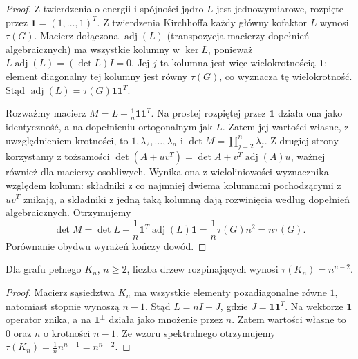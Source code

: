 \begin{proof}
Z twierdzenia o energii i spójności jądro $L$ jest
jednowymiarowe, rozpięte przez $\mathbf1=(1,\ldots,1)^T$.
Z twierdzenia Kirchhoffa każdy główny kofaktor $L$
wynosi $\tau(G)$. Macierz dołączona
$\operatorname{adj}(L)$ (transpozycja macierzy dopełnień
algebraicznych) ma wszystkie kolumny w $\ker L$,
ponieważ $L\operatorname{adj}(L)=(\det L)I=0$.
Jej $j$-ta kolumna jest więc wielokrotnością
$\mathbf1$; element diagonalny tej kolumny jest
równy $\tau(G)$, co wyznacza tę wielokrotność.
Stąd $\operatorname{adj}(L)=\tau(G)\mathbf1\mathbf1^T$.

Rozważmy macierz
$M=L+\tfrac1n\mathbf1\mathbf1^T$.
Na prostej rozpiętej przez $\mathbf1$ działa ona jako
identyczność, a na dopełnieniu ortogonalnym jak $L$.
Zatem jej wartości własne, z uwzględnieniem krotności,
to $1,\lambda_2,\ldots,\lambda_n$
i $\det M=\prod_{j=2}^n\lambda_j$.
Z drugiej strony korzystamy z tożsamości
$\det(A+uv^T)=\det A+v^T\operatorname{adj}(A)u$,
ważnej również dla macierzy osobliwych.
Wynika ona z wieloliniowości wyznacznika względem
kolumn: składniki z co najmniej dwiema kolumnami
pochodzącymi z $uv^T$ znikają, a składniki z jedną
taką kolumną dają rozwinięcia według dopełnień
algebraicznych. Otrzymujemy
\[
\det M=\det L+\frac1n\mathbf1^T\operatorname{adj}(L)\mathbf1
=\frac1n\tau(G)n^2=n\tau(G).
\]
Porównanie obydwu wyrażeń kończy dowód.
\end{proof}

\begin{wniosek}
Dla grafu pełnego $K_n$, $n\ge2$, liczba drzew
rozpinających wynosi $\tau(K_n)=n^{n-2}$.
\end{wniosek}

\begin{proof}
Macierz sąsiedztwa $K_n$ ma wszystkie elementy
pozadiagonalne równe $1$, natomiast stopnie wynoszą
$n-1$. Stąd $L=nI-J$, gdzie $J=\mathbf1\mathbf1^T$.
Na wektorze $\mathbf1$ operator znika, a na
$\mathbf1^\perp$ działa jako mnożenie przez $n$.
Zatem wartości własne to $0$ oraz $n$ o krotności $n-1$.
Ze wzoru spektralnego otrzymujemy
$\tau(K_n)=\frac1n n^{n-1}=n^{n-2}$.
\end{proof}

